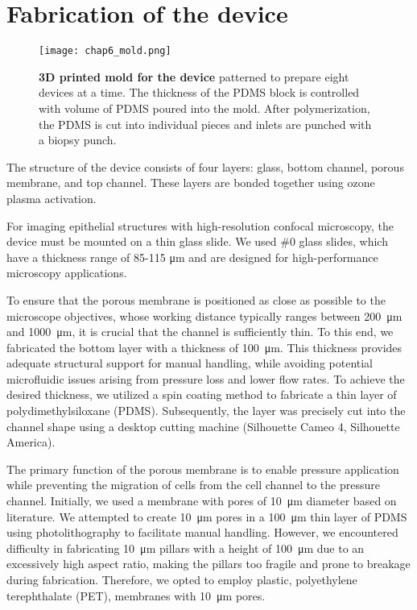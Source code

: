 \hypertarget{fabrication-of-the-device}{%
\section{Fabrication of the device}\label{fabrication-of-the-device}}

\begin{figure}[b!]
	\centering
	\texttt{[image: chap6\_mold.png]}
	\caption{ \textbf{3D printed mold for the device} patterned to prepare eight devices at a time. The thickness of the PDMS block is controlled with volume of PDMS poured into the mold. After polymerization, the PDMS is cut into individual pieces and inlets are punched with a biopsy punch.}\label{fig_6_1a}
\end{figure}

The structure of the device consists of four layers: glass, bottom channel, porous membrane, and top channel. These layers are bonded together using ozone plasma activation.

For imaging epithelial structures with high-resolution confocal microscopy, the device must be mounted on a thin glass slide. We used \#0 glass slides, which have a thickness range of 85-115 \unit{\um} and are designed for high-performance microscopy applications. 

To ensure that the porous membrane is positioned as close as possible to the microscope objectives, whose working distance typically ranges between 200~\unit{\um} and 1000~\unit{\um}, it is crucial that the channel is sufficiently thin. To this end, we fabricated the bottom layer with a thickness of 100~\unit{\um}. This thickness provides adequate structural support for manual handling, while avoiding potential microfluidic issues arising from pressure loss and lower flow rates. To achieve the desired thickness, we utilized a spin coating method to fabricate a thin layer of polydimethylsiloxane (PDMS). Subsequently, the layer was precisely cut into the channel shape using a desktop cutting machine (Silhouette Cameo 4, Silhouette America).

The primary function of the porous membrane is to enable pressure application while preventing the migration of cells from the cell channel to the pressure channel. Initially, we used a membrane with pores of 10~\unit{\um} diameter based on literature. We attempted to create 10~\unit{\um} pores in a 100~\unit{\um} thin layer of PDMS using photolithography to facilitate manual handling. However, we encountered difficulty in fabricating 10~\unit{\um} pillars with a height of 100~\unit{\um} due to an excessively high aspect ratio, making the pillars too fragile and prone to breakage during fabrication. Therefore, we opted to employ plastic, polyethylene terephthalate (PET), membranes with 10~\unit{\um} pores. 


